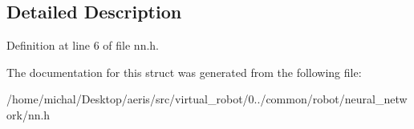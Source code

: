 \subsection{Detailed Description}


Definition at line 6 of file nn.\-h.



The documentation for this struct was generated from the following file\-:\begin{DoxyCompactItemize}
\item 
/home/michal/\-Desktop/aeris/src/virtual\-\_\-robot/0../common/robot/neural\-\_\-network/nn.\-h\end{DoxyCompactItemize}
